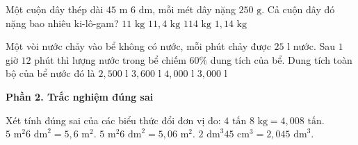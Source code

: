 \begin{ex} %
Một cuộn dây thép dài $45\text{ m } 6\text{ dm}$, mỗi mét dây nặng $250\text{ g}$. Cả cuộn dây đó nặng bao nhiêu ki-lô-gam?
\choice
{$11\text{ kg}$}
{\True $11{,}4\text{ kg}$}
{$114\text{ kg}$}
{$1{,}14\text{ kg}$}
\end{ex}

\begin{ex} %
Một vòi nước chảy vào bể không có nước, mỗi phút chảy được $25\text{ l}$ nước. Sau $1$ giờ $12$ phút thì lượng nước trong bể chiếm $60\%$ dung tích của bể. Dung tích toàn bộ của bể nước đó là
\choice
{$2,500\text{ l}$}
{$3,600\text{ l}$}
{$4,000\text{ l}$}
{\True $3,000\text{ l}$}
\end{ex}

\textbf{Phần 2. Trắc nghiệm đúng sai}

\begin{ex} %
Xét tính đúng sai của các biểu thức đổi đơn vị đo:
\choiceTF
{\True $4\text{ tấn } 8\text{ kg} = 4{,}008\text{ tấn}$.}
{$5\text{ m}^2 6\text{ dm}^2 = 5{,}6\text{ m}^2$.}
{\True $5\text{ m}^2 6\text{ dm}^2 = 5{,}06\text{ m}^2$.}
{\True $2\text{ dm}^3 45\text{ cm}^3 = 2{,}045\text{ dm}^3$.}
\end{ex}

